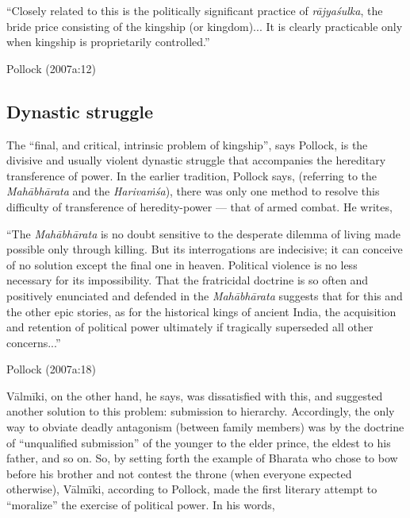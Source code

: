 \begin{myquote}
“Closely related to this is the politically significant practice of {\sl rājyaśulka}, the bride price consisting of the kingship (or kingdom)... It is clearly practicable only when kingship is proprietarily controlled.”

\hfill Pollock (2007a:12)
\end{myquote}

\subsection{Dynastic struggle}\label{sec1.2.3}

The “final, and critical, intrinsic problem of kingship”, says Pollock, is the divisive and usually violent dynastic struggle that accompanies the hereditary transference of power. In the earlier tradition, Pollock says, (referring to the {\sl Mahābhārata} and the {\sl Harivaṁśa}), there was only one method to resolve this difficulty of transference of heredity-power --- that of armed combat. He writes,

\begin{myquote}
“The {\sl Mahābhārata} is no doubt sensitive to the desperate dilemma of living made possible only through killing. But its interrogations are indecisive; it can conceive of no solution except the final one in heaven. Political violence is no less necessary for its impossibility. That the fratricidal doctrine is so often and positively enunciated and defended in the {\sl Mahābhārata} suggests that for this and the other epic stories, as for the historical kings of ancient India, the acquisition and retention of political power ultimately if tragically superseded all other concerns...”

\hfill Pollock (2007a:18) 
\end{myquote}

\newpage

Vālmīki, on the other hand, he says, was dissatisfied with this, and suggested another solution to this problem: submission to hierarchy. Accordingly, the only way to obviate deadly antagonism (between family members) was by the doctrine of “unqualified submission” of the younger to the elder prince, the eldest to his father, and so on. So, by setting forth the example of Bharata who chose to bow before his brother and not contest the throne (when everyone expected otherwise), Vālmīki, according to Pollock, made the first literary attempt to “moralize” the exercise of political power. In his words,


